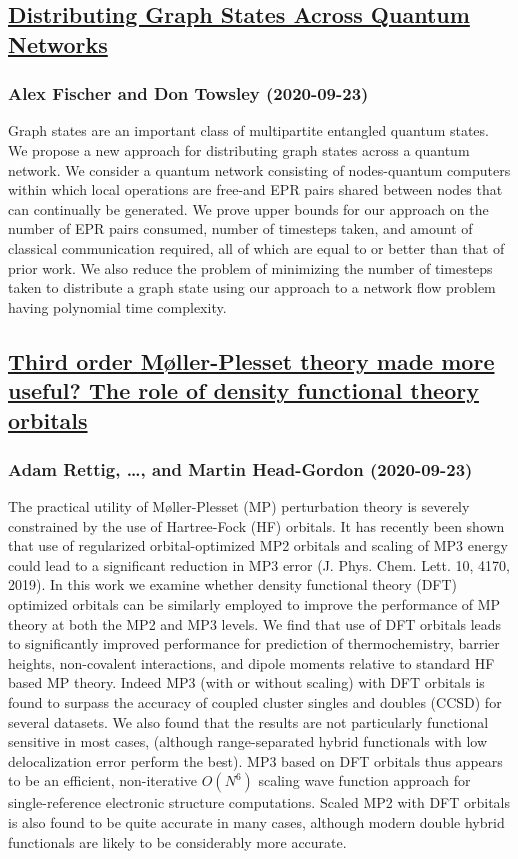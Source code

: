 {\subsection*{\href{http://arxiv.org/abs/2009.10888v1}{Distributing Graph States Across Quantum Networks}}
\subsubsection*{Alex Fischer and Don Towsley (2020-09-23)}
Graph states are an important class of multipartite entangled quantum states.
We propose a new approach for distributing graph states across a quantum
network. We consider a quantum network consisting of nodes-quantum computers
within which local operations are free-and EPR pairs shared between nodes that
can continually be generated. We prove upper bounds for our approach on the
number of EPR pairs consumed, number of timesteps taken, and amount of
classical communication required, all of which are equal to or better than that
of prior work. We also reduce the problem of minimizing the number of timesteps
taken to distribute a graph state using our approach to a network flow problem
having polynomial time complexity.

\subsection*{\href{http://arxiv.org/abs/2009.10870v1}{Third order Møller-Plesset theory made more useful? The role of  density functional theory orbitals}}
\subsubsection*{Adam Rettig, \dots, and Martin Head-Gordon (2020-09-23)}
The practical utility of M{\o}ller-Plesset (MP) perturbation theory is
severely constrained by the use of Hartree-Fock (HF) orbitals. It has recently
been shown that use of regularized orbital-optimized MP2 orbitals and scaling
of MP3 energy could lead to a significant reduction in MP3 error (J. Phys.
Chem. Lett. 10, 4170, 2019). In this work we examine whether density functional
theory (DFT) optimized orbitals can be similarly employed to improve the
performance of MP theory at both the MP2 and MP3 levels. We find that use of
DFT orbitals leads to significantly improved performance for prediction of
thermochemistry, barrier heights, non-covalent interactions, and dipole moments
relative to standard HF based MP theory. Indeed MP3 (with or without scaling)
with DFT orbitals is found to surpass the accuracy of coupled cluster singles
and doubles (CCSD) for several datasets. We also found that the results are not
particularly functional sensitive in most cases, (although range-separated
hybrid functionals with low delocalization error perform the best). MP3 based
on DFT orbitals thus appears to be an efficient, non-iterative $O(N^6)$ scaling
wave function approach for single-reference electronic structure computations.
Scaled MP2 with DFT orbitals is also found to be quite accurate in many cases,
although modern double hybrid functionals are likely to be considerably more
accurate.

}
